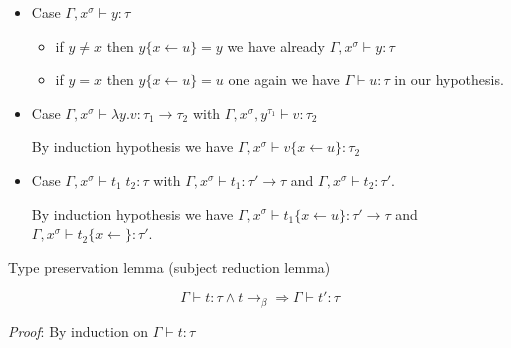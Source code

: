   \begin{itemize}
    \item Case $\Gamma, x^\sigma \vdash y : \tau$
      \begin{itemize}
        \item if $y \not = x$ then $y\{x \leftarrow u\} = y$
          we have already $\Gamma, x^\sigma \vdash y : \tau$
        \item if $y = x$ then $y\{x \leftarrow u\} = u$
          one again we have $\Gamma\vdash u : \tau$ in our hypothesis.
      \end{itemize}

    \item Case $\Gamma, x^\sigma \vdash \lambda y.v : \tau_1 \to \tau_2$ with
      $\Gamma, x^\sigma, y^{\tau_1} \vdash v : \tau_2$

      By induction hypothesis we have $\Gamma, x^\sigma
      \vdash v\{x\leftarrow u\} : \tau_2$

    \item Case $\Gamma, x^\sigma \vdash t_1\;t_2 : \tau$ with 
      $\Gamma, x^\sigma \vdash t_1 : \tau ' \to \tau$ and
      $\Gamma, x^\sigma \vdash t_2 : \tau '$.
      
      By induction hypothesis we have
      $\Gamma, x^\sigma \vdash t_1\{x \leftarrow u\} : \tau ' \to \tau$ and
      $\Gamma, x^\sigma \vdash t_2\{x\leftarrow\} : \tau '$.
  \end{itemize}

  \qedsymbol

  \lemma Type preservation lemma (subject reduction lemma)

  $$\Gamma\vdash t : \tau \wedge t \to_\beta \Rightarrow \Gamma \vdash t' : \tau$$

  \textit{Proof}: By induction on $\Gamma \vdash t : \tau$

